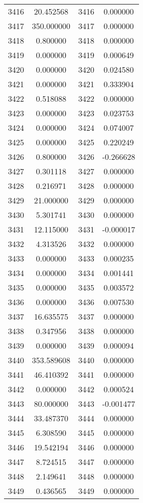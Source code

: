 \documentclass[12pt]{article}
\begin{document}
\begin{longtable}{@{}cccc@{}}
3416 & 20.452568 & 3416 & 0.000000 \\
3417 & 350.000000 & 3417 & 0.000000 \\
3418 & 0.800000 & 3418 & 0.000000 \\
3419 & 0.000000 & 3419 & 0.000649 \\
3420 & 0.000000 & 3420 & 0.024580 \\
3421 & 0.000000 & 3421 & 0.333904 \\
3422 & 0.518088 & 3422 & 0.000000 \\
3423 & 0.000000 & 3423 & 0.023753 \\
3424 & 0.000000 & 3424 & 0.074007 \\
3425 & 0.000000 & 3425 & 0.220249 \\
3426 & 0.800000 & 3426 & -0.266628 \\
3427 & 0.301118 & 3427 & 0.000000 \\
3428 & 0.216971 & 3428 & 0.000000 \\
3429 & 21.000000 & 3429 & 0.000000 \\
3430 & 5.301741 & 3430 & 0.000000 \\
3431 & 12.115000 & 3431 & -0.000017 \\
3432 & 4.313526 & 3432 & 0.000000 \\
3433 & 0.000000 & 3433 & 0.000235 \\
3434 & 0.000000 & 3434 & 0.001441 \\
3435 & 0.000000 & 3435 & 0.003572 \\
3436 & 0.000000 & 3436 & 0.007530 \\
3437 & 16.635575 & 3437 & 0.000000 \\
3438 & 0.347956 & 3438 & 0.000000 \\
3439 & 0.000000 & 3439 & 0.000094 \\
3440 & 353.589608 & 3440 & 0.000000 \\
3441 & 46.410392 & 3441 & 0.000000 \\
3442 & 0.000000 & 3442 & 0.000524 \\
3443 & 80.000000 & 3443 & -0.001477 \\
3444 & 33.487370 & 3444 & 0.000000 \\
3445 & 6.308590 & 3445 & 0.000000 \\
3446 & 19.542194 & 3446 & 0.000000 \\
3447 & 8.724515 & 3447 & 0.000000 \\
3448 & 2.149641 & 3448 & 0.000000 \\
3449 & 0.436565 & 3449 & 0.000000 \\

\end{longtable}
\end{document}
